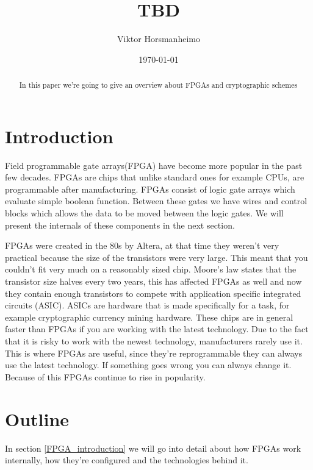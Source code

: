 \documentclass{paper}
\title{TBD}
\author{Viktor Horsmanheimo}
\date{\today}
\begin{document}
\maketitle
\tableofcontents
\newpage

\begin{abstract}
    In this paper we're going to give an overview about FPGAs and cryptographic
    schemes
\end{abstract}

\section{Introduction}
Field programmable gate arrays(FPGA) have become more popular in the past few
decades. FPGAs are chips that unlike standard ones for example
CPUs, are programmable after manufacturing. FPGAs consist of logic gate arrays
which evaluate simple boolean function. Between these gates we have wires
and control blocks which allows the data to be moved between the logic gates.
We will present the internals of these components in the next section.

FPGAs were created in the 80s by Altera, at that time they weren't very
practical because the size of the transistors were very large. This meant that
you couldn't fit very much on a reasonably sized chip. Moore's law states that
the transistor size halves every two years, this has affected FPGAs as well and
now they contain enough transistors to compete with application specific
integrated circuits (ASIC). ASICs are hardware that is made specifically for a
task, for example cryptographic currency mining hardware. These chips are in
general faster than FPGAs if you are working with the latest technology. Due to
the fact that it is risky to work with the newest technology, manufacturers
rarely use it. This is where FPGAs are useful, since they're reprogrammable
they can always use the latest technology. If something goes wrong you can
always change it. Because of this FPGAs continue to rise in popularity. %


\section{Outline}
In section \ref{FPGA_introduction} we will go into detail about how FPGAs work
internally, how they're configured and the technologies behind it.
\end{document}
